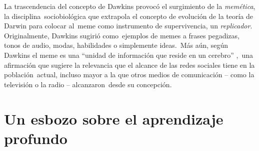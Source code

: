 La trascendencia del concepto de Dawkins provocó el surgimiento de la \emph{memética}, la disciplina\
sociobiológica que extrapola el concepto de evolución de la teoría de Darwin para colocar al\
meme como instrumento de supervivencia, un \emph{replicador}. Originalmente, Dawkins sugirió como\
ejemplos de memes a frases pegadizas, tonos de audio, modas, habilidades o simplemente ideas.\
Más aún, según Dawkins el meme es una ``unidad de información que reside en un cerebro'' \cite{dawkins2006},\
una afirmación que sugiere la relevancia que el alcance de las redes sociales tiene en la población\
actual, incluso mayor a la que otros medios de comunicación -- como la televisión o la radio -- alcanzaron\
desde su concepción.

\section{Un esbozo sobre el aprendizaje profundo}

